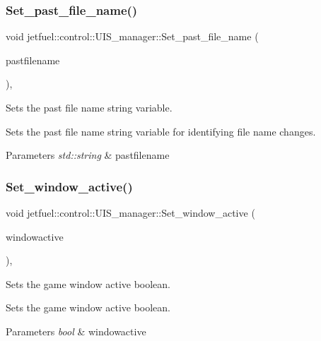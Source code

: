 \subsubsection{\texorpdfstring{Set\+\_\+past\+\_\+file\+\_\+name()}{Set\_past\_file\_name()}}
{\footnotesize\ttfamily void jetfuel\+::control\+::\+U\+I\+S\+\_\+manager\+::\+Set\+\_\+past\+\_\+file\+\_\+name (\begin{DoxyParamCaption}\item[{const std\+::string}]{pastfilename }\end{DoxyParamCaption})\hspace{0.3cm}{\ttfamily [inline]}, {\ttfamily [protected]}}



Sets the past file name string variable. 

Sets the past file name string variable for identifying file name changes.


\begin{DoxyParams}{Parameters}
{\em std\+::string} & pastfilename \\
\hline
\end{DoxyParams}
\mbox{\label{classjetfuel_1_1control_1_1UIS__manager_aadc46749d1ea102cf957bcc6da98654e}} 
\subsubsection{\texorpdfstring{Set\+\_\+window\+\_\+active()}{Set\_window\_active()}}
{\footnotesize\ttfamily void jetfuel\+::control\+::\+U\+I\+S\+\_\+manager\+::\+Set\+\_\+window\+\_\+active (\begin{DoxyParamCaption}\item[{const bool}]{windowactive }\end{DoxyParamCaption})\hspace{0.3cm}{\ttfamily [inline]}, {\ttfamily [protected]}}



Sets the game window active boolean. 

Sets the game window active boolean.


\begin{DoxyParams}{Parameters}
{\em bool} & windowactive \\
\hline
\end{DoxyParams}


